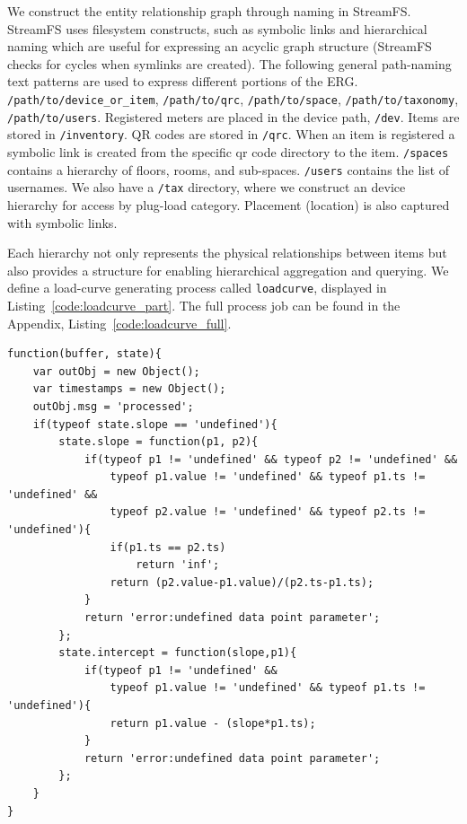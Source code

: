 We construct the entity relationship graph through naming in StreamFS.  StreamFS uses filesystem constructs, such as symbolic
links and hierarchical naming which are useful for expressing an acyclic graph structure (StreamFS checks for cycles when symlinks 
are created).  
The following general path-naming text patterns are used to express different portions of the ERG.
\texttt{/path/to/device\_or\_item}, 
\texttt{/path/to/qrc}, \texttt{/path/to/space}, \texttt{/path/to/taxonomy}, \texttt{/path/to/users}.  
Registered meters are placed in the device path, \texttt{/dev}.  Items are stored in \texttt{/inventory}.  QR codes are stored 
in \texttt{/qrc}.  When an item is registered a 
symbolic link is created from the specific qr code directory to the item.  \texttt{/spaces} contains a hierarchy of floors, rooms, 
and sub-spaces.  \texttt{/users} contains the list of usernames.  We also have a \texttt{/tax} directory, where we construct an
device hierarchy for access by plug-load category.  Placement (location) is also captured with symbolic links. 

Each hierarchy not only represents the physical relationships between items but also provides a structure for 
enabling hierarchical aggregation and querying.  We define a load-curve generating process called \texttt{loadcurve}, displayed in 
Listing~\ref{code:loadcurve_part}.  The full process job can be found in the Appendix, Listing~\ref{code:loadcurve_full}.

\begin{lstlisting}[caption={Partial load curve code used to generate aggregate load curves in the Energy Lens application.},label={code:loadcurve_part}]
function(buffer, state){
    var outObj = new Object();
    var timestamps = new Object();
    outObj.msg = 'processed';
    if(typeof state.slope == 'undefined'){
        state.slope = function(p1, p2){
            if(typeof p1 != 'undefined' && typeof p2 != 'undefined' &&
                typeof p1.value != 'undefined' && typeof p1.ts != 'undefined' &&
                typeof p2.value != 'undefined' && typeof p2.ts != 'undefined'){
                if(p1.ts == p2.ts)
                    return 'inf';
                return (p2.value-p1.value)/(p2.ts-p1.ts);
            }
            return 'error:undefined data point parameter';
        };
        state.intercept = function(slope,p1){
            if(typeof p1 != 'undefined' &&
                typeof p1.value != 'undefined' && typeof p1.ts != 'undefined'){
                return p1.value - (slope*p1.ts);
            }
            return 'error:undefined data point parameter';
        };
    }
}
\end{lstlisting}

